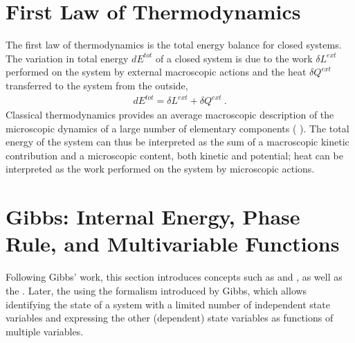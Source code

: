\documentclass[letterpaper,10pt,english]{jupyterBook}
\begin{document}
\sphinxstepscope


\section{First Law of Thermodynamics}
\label{\detokenize{ch/principles-first:first-law-of-thermodynamics}}\label{\detokenize{ch/principles-first:physics-hs-thermodynamics-foundation-principles-first}}\label{\detokenize{ch/principles-first::doc}}
\sphinxAtStartPar
The first law of thermodynamics is the total energy balance for closed systems. The variation in total energy \(d E^{tot}\) of a closed system is due to the work \(\delta L^{ext}\) performed on the system by external macroscopic actions and the heat \(\delta Q^{ext}\) transferred to the system from the outside,
\begin{equation*}
\begin{split}d E^{tot} = \delta L^{ext} + \delta Q^{ext} \ .\end{split}
\end{equation*}
\sphinxAtStartPar
Classical thermodynamics provides an average macroscopic description of the microscopic dynamics of a large number of elementary components ( ). The total energy of the system can thus be interpreted as the sum of a macroscopic kinetic contribution and a microscopic content, both kinetic and potential; heat can be interpreted as the work performed on the system by microscopic actions.



\sphinxstepscope


\section{Gibbs: Internal Energy, Phase Rule, and Multivariable Functions}
\label{\detokenize{ch/principles-gibbs-phase-rule:gibbs-internal-energy-phase-rule-and-multivariable-functions}}\label{\detokenize{ch/principles-gibbs-phase-rule:physics-hs-thermodynamics-foundation-principles-gibbs-phase-rule}}\label{\detokenize{ch/principles-gibbs-phase-rule::doc}}
\sphinxAtStartPar
Following Gibbs’ work, this section introduces concepts such as {\hyperref[\detokenize{ch/principles-gibbs-phase-rule:physics-hs-thermodynamics-foundation-principles-gibbs-phase-rule-state-vars}]{}} and {\hyperref[\detokenize{ch/principles-gibbs-phase-rule:physics-hs-thermodynamics-foundation-principles-gibbs-phase-rule-internal-energy}]{}}, as well as the {\hyperref[\detokenize{ch/principles-gibbs-phase-rule:physics-hs-thermodynamics-foundation-principles-gibbs-phase-rule-gibbs-phase-rule}]{}}. Later, the {\hyperref[\detokenize{ch/principles-gibbs-phase-rule:physics-hs-thermodynamics-foundation-principles-gibbs-phase-rule-first}]{}} using the formalism introduced by Gibbs, which allows identifying the state of a system with a limited number of independent state variables and expressing the other (dependent) state variables as functions of multiple variables.
\end{document}
